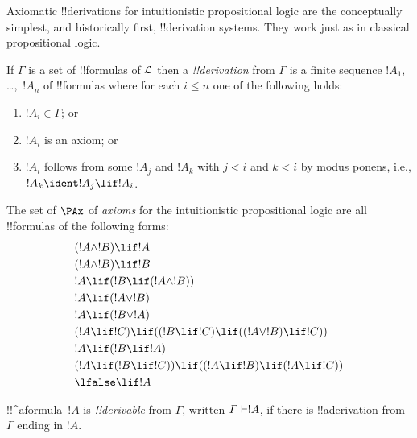 \documentclass[../../../include/open-logic-section]{subfiles}
\begin{document}


Axiomatic !!{derivation}s for intuitionistic propositional logic are
the conceptually simplest, and historically first, !!{derivation}
systems. They work just as in classical propositional logic.

\begin{defn}[!!^{derivability}]
If $\Gamma$ is a set of !!{formula}s of $\Lang L$ then a
\emph{!!{derivation}} from $\Gamma$ is a finite sequence $!A_1$,
\dots,~$!A_n$ of !!{formula}s where for each $i \le n$ one of the
following holds:
\begin{enumerate}
\item $!A_i \in \Gamma$; or
\item $!A_i$ is an axiom; or
\item $!A_i$ follows from some $!A_j$ and $!A_k$ with $j < i$ and $k <
  i$ by modus ponens, i.e., $!A_k \ident !A_j \lif !A_i$.
\end{enumerate}
\end{defn}

\begin{defn}[Axioms]
The set of $\PAx$ of \emph{axioms} for the intuitionistic propositional logic 
are all !!{formula}s of the following forms:
\begin{align}
  & (!A \land !B) \lif !A \ollabel{ax:land1}\\
  & (!A \land !B) \lif !B \ollabel{ax:land2}\\
  & !A \lif (!B \lif (!A \land !B)) \ollabel{ax:land3}\\
  & !A \lif (!A \lor !B) \ollabel{ax:lor1}\\
  & !A \lif (!B \lor !A) \ollabel{ax:lor2}\\
  & (!A \lif !C) \lif ((!B \lif !C) \lif ((!A \lor !B) \lif !C)) \ollabel{ax:lor3}\\
  & !A \lif (!B \lif !A) \ollabel{ax:lif1}\\
  & (!A \lif (!B \lif !C)) \lif ((!A \lif !B) \lif (!A \lif !C)) \ollabel{ax:lif2}\\
  & \lfalse \lif !A \ollabel{ax:lfalse1}
\end{align}
\end{defn}

\begin{defn}[!!^{derivability}]
!!^a{formula}~$!A$ is \emph{!!{derivable}} from $\Gamma$, written
$\Gamma \Proves !A$, if there is !!a{derivation} from $\Gamma$ ending
in $!A$.
\end{defn}
\end{document}

